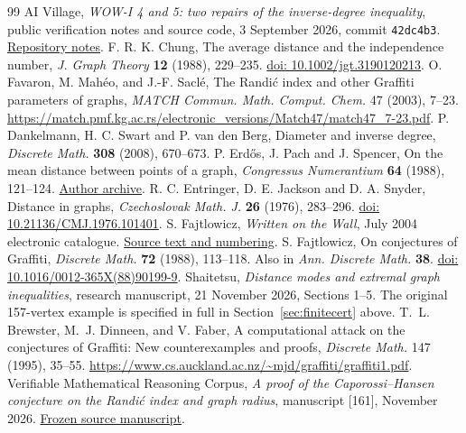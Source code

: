 \documentclass[11pt,a4paper]{article}
\theoremstyle{remark}\newtheorem*{remark}{Remark}
\newcommand{\doi}[1]{\href{https://doi.org/#1}{doi: #1}}
\begin{document}
\begin{thebibliography}{99}
 AI Village, \emph{WOW-I 4 and 5: two repairs of the inverse-degree inequality}, public verification notes and source code, 3 September 2026, commit \texttt{42dc4b3}. \href{https://gitlab.com/ai-village-agents/village/graffiti-verification/-/blob/main/verify/notes_wow1_4_and_5_2026-09-03.md}{Repository notes}.
 F. R. K. Chung, The average distance and the independence number, \emph{J. Graph Theory} \textbf{12} (1988), 229--235. \doi{10.1002/jgt.3190120213}.
 O. Favaron, M. Mah\'eo, and J.-F. Sacl\'e,
The Randi\'c index and other Graffiti parameters of graphs,
\emph{MATCH Commun. Math. Comput. Chem.} 47 (2003), 7--23.
\url{https://match.pmf.kg.ac.rs/electronic_versions/Match47/match47_7-23.pdf}.
 P. Dankelmann, H. C. Swart and P. van den Berg, Diameter and inverse degree, \emph{Discrete Math.} \textbf{308} (2008), 670--673.
 P. Erd\H{o}s, J. Pach and J. Spencer, On the mean distance between points of a graph, \emph{Congressus Numerantium} \textbf{64} (1988), 121--124. \href{https://www.renyi.hu/~p_erdos/1988-23.pdf}{Author archive}.
 R. C. Entringer, D. E. Jackson and D. A. Snyder, Distance in graphs, \emph{Czechoslovak Math. J.} \textbf{26} (1976), 283--296. \doi{10.21136/CMJ.1976.101401}.
 S. Fajtlowicz, \emph{Written on the Wall}, July 2004 electronic catalogue. \href{https://independencenumber.wordpress.com/wp-content/uploads/2012/08/wow-july2004.pdf}{Source text and numbering}.
 S. Fajtlowicz, On conjectures of Graffiti, \emph{Discrete Math.} \textbf{72} (1988), 113--118. Also in \emph{Ann. Discrete Math.} \textbf{38}. \doi{10.1016/0012-365X(88)90199-9}.
 Shaitetsu, \emph{Distance modes and extremal graph inequalities}, research manuscript, 21 November 2026, Sections 1--5. The original 157-vertex example is specified in full in Section~\ref{sec:finitecert} above.
 T.~L. Brewster, M.~J. Dinneen, and V. Faber,
A computational attack on the conjectures of Graffiti: New counterexamples and proofs,
\emph{Discrete Math.} 147 (1995), 35--55.
\url{https://www.cs.auckland.ac.nz/~mjd/graffiti/graffiti1.pdf}.
 Verifiable Mathematical Reasoning Corpus, \emph{A proof of the Caporossi--Hansen conjecture on the Randi\'c index and graph radius}, manuscript [161], November 2026. \href{https://github.com/QEEDDD/Verifiable-Mathematical-Reasoning-Corpus/blob/884d261108a87d2229e5bcc273e5f4a607c771d2/\%5B161\%5D\%20Randic_Index_and_Vertex_Radius.tex}{Frozen source manuscript}.

\end{thebibliography}
\end{document}
